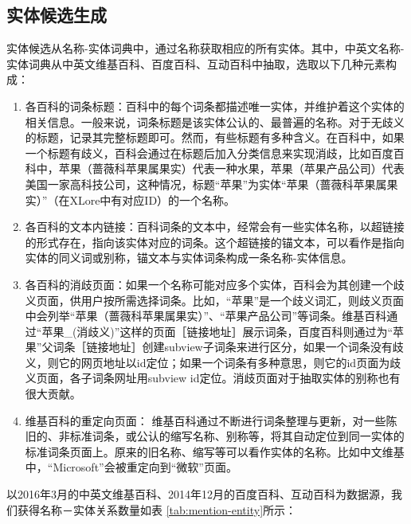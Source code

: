 \subsection{实体候选生成}

实体候选从名称-实体词典中，通过名称获取相应的所有实体。其中，中英文名称-实体词典从中英文维基百科、百度百科、互动百科中抽取，选取以下几种元素构成：

\begin{enumerate}[1.]
\item 各百科的词条标题：百科中的每个词条都描述唯一实体，并维护着这个实体的相关信息。一般来说，词条标题是该实体公认的、最普遍的名称。对于无歧义的标题，记录其完整标题即可。然而，有些标题有多种含义。在百科中，如果一个标题有歧义，百科会通过在标题后加入分类信息来实现消歧，比如百度百科中，苹果（蔷薇科苹果属果实）代表一种水果，苹果（苹果产品公司）代表美国一家高科技公司，这种情况，标题“苹果”为实体“苹果（蔷薇科苹果属果实）”（在XLore中有对应ID）的一个名称。
\item 各百科的文本内链接：百科词条的文本中，经常会有一些实体名称，以超链接的形式存在，指向该实体对应的词条。这个超链接的锚文本，可以看作是指向实体的同义词或别称，锚文本与实体词条构成一条名称-实体信息。
\item 各百科的消歧页面：如果一个名称可能对应多个实体，百科会为其创建一个歧义页面，供用户按所需选择词条。比如，“苹果”是一个歧义词汇，则歧义页面中会列举“苹果（蔷薇科苹果属果实）”、“苹果产品公司”等词条。维基百科通过“苹果\_(消歧义)”这样的页面［链接地址］展示词条，百度百科则通过为“苹果”父词条［链接地址］创建subview子词条来进行区分，如果一个词条没有歧义，则它的网页地址以id定位；如果一个词条有多种意思，则它的id页面为歧义页面，各子词条网址用subview id定位。消歧页面对于抽取实体的别称也有很大贡献。
\item 维基百科的重定向页面： 维基百科通过不断进行词条整理与更新，对一些陈旧的、非标准词条，或公认的缩写名称、别称等，将其自动定位到同一实体的标准词条页面上。原来的旧名称、缩写等可以看作实体的名称。比如中文维基中，“Microsoft”会被重定向到“微软”页面。
\end{enumerate}

以2016年3月的中英文维基百科、2014年12月的百度百科、互动百科为数据源，我们获得名称－实体关系数量如表 \ref{tab:mention-entity}所示：

